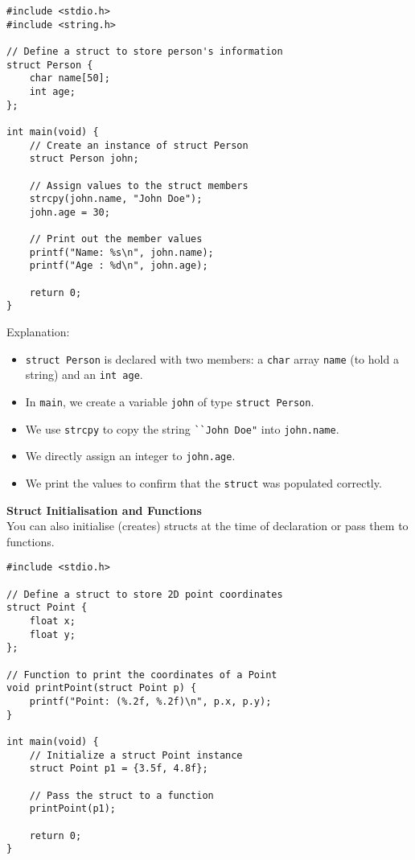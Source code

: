 \documentclass[a4paper,12pt]{article}
\begin{document}
\begin{lstlisting}[caption={Defining and using a simple struct in C}, label={lst:basic-struct}]
#include <stdio.h>
#include <string.h>

// Define a struct to store person's information
struct Person {
    char name[50];
    int age;
};

int main(void) {
    // Create an instance of struct Person
    struct Person john;

    // Assign values to the struct members
    strcpy(john.name, "John Doe");
    john.age = 30;

    // Print out the member values
    printf("Name: %s\n", john.name);
    printf("Age : %d\n", john.age);

    return 0;
}
\end{lstlisting}

Explanation:

\begin{itemize}
    \item \verb|struct Person| is declared with two members: a \verb|char| array \verb|name| (to hold a string) and an \verb|int age|.
    \item In \verb|main|, we create a variable \verb|john| of type \verb|struct Person|.
    \item We use \verb|strcpy| to copy the string \verb|``John Doe"| into \verb|john.name|.
    \item We directly assign an integer to \verb|john.age|.
    \item We print the values to confirm that the \verb|struct| was populated correctly.
\end{itemize}

\newpage

\textbf{Struct Initialisation and Functions}\\
You can also initialise (creates) structs at the time of declaration or pass them to functions.\\

\begin{lstlisting}[caption={Initializing a struct and passing it to a function}, label={lst:func-struct}]
#include <stdio.h>

// Define a struct to store 2D point coordinates
struct Point {
    float x;
    float y;
};

// Function to print the coordinates of a Point
void printPoint(struct Point p) {
    printf("Point: (%.2f, %.2f)\n", p.x, p.y);
}

int main(void) {
    // Initialize a struct Point instance
    struct Point p1 = {3.5f, 4.8f};

    // Pass the struct to a function
    printPoint(p1);

    return 0;
}
\end{lstlisting}
\end{document}
